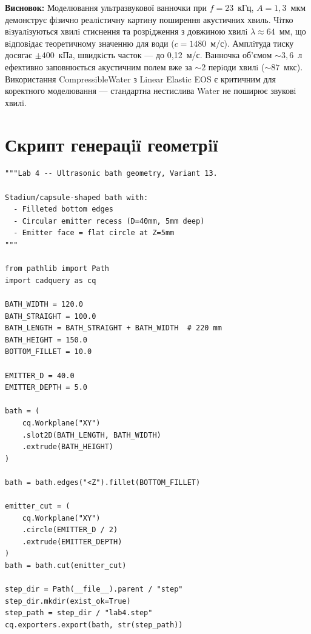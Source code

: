 \textbf{Висновок:} Моделювання ультразвукової ванночки при $f = 23$~кГц, $A = 1{,}3$~мкм демонструє фiзично реалiстичну картину поширення акустичних хвиль. Чiтко вiзуалiзуються хвилi стиснення та розрiдження з довжиною хвилi $\lambda \approx 64$~мм, що вiдповiдає теоретичному значенню для води ($c = 1480$~м/с). Амплiтуда тиску досягає $\pm 400$~кПа, швидкiсть часток --- до 0{,}12~м/с. Ванночка об'ємом $\sim 3{,}6$~л ефективно заповнюється акустичним полем вже за $\sim 2$ перiоди хвилi ($\sim 87$~мкс). Використання CompressibleWater з Linear Elastic EOS є критичним для коректного моделювання --- стандартна нестислива Water не поширює звуковi хвилi.

\appendix
\section{Скрипт генерацiї геометрiї}

\begin{lstlisting}[style=python]
"""Lab 4 -- Ultrasonic bath geometry, Variant 13.

Stadium/capsule-shaped bath with:
  - Filleted bottom edges
  - Circular emitter recess (D=40mm, 5mm deep)
  - Emitter face = flat circle at Z=5mm
"""

from pathlib import Path
import cadquery as cq

BATH_WIDTH = 120.0
BATH_STRAIGHT = 100.0
BATH_LENGTH = BATH_STRAIGHT + BATH_WIDTH  # 220 mm
BATH_HEIGHT = 150.0
BOTTOM_FILLET = 10.0

EMITTER_D = 40.0
EMITTER_DEPTH = 5.0

bath = (
    cq.Workplane("XY")
    .slot2D(BATH_LENGTH, BATH_WIDTH)
    .extrude(BATH_HEIGHT)
)

bath = bath.edges("<Z").fillet(BOTTOM_FILLET)

emitter_cut = (
    cq.Workplane("XY")
    .circle(EMITTER_D / 2)
    .extrude(EMITTER_DEPTH)
)
bath = bath.cut(emitter_cut)

step_dir = Path(__file__).parent / "step"
step_dir.mkdir(exist_ok=True)
step_path = step_dir / "lab4.step"
cq.exporters.export(bath, str(step_path))
\end{lstlisting}


